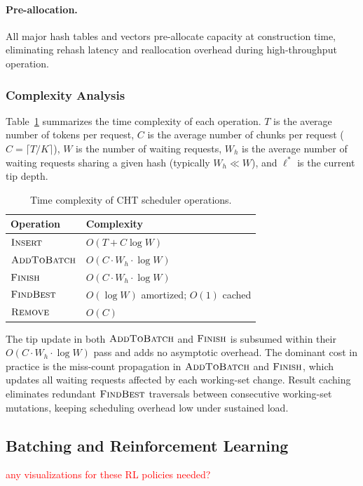 \paragraph{Pre-allocation.}
All major hash tables and vectors pre-allocate capacity at construction time, eliminating rehash latency and reallocation overhead during high-throughput operation.

\subsubsection*{Complexity Analysis}

Table~\ref{tab:complexity} summarizes the time complexity of each operation. $T$ is the average number of tokens per request, $C$ is the average number of chunks per request ($C = \lceil T/K \rceil$), $W$ is the number of waiting requests, $W_h$ is the average number of waiting requests sharing a given hash (typically $W_h \ll W$), and $\ell^*$ is the current tip depth.

\begin{table}[H]
\centering
\caption{Time complexity of CHT scheduler operations.}
\label{tab:complexity}
\begin{tabular}{ll}
\hline
\textbf{Operation} & \textbf{Complexity} \\
\hline
$\textsc{Insert}$      & $O(T + C \log W)$ \\
$\textsc{AddToBatch}$  & $O(C \cdot W_h \cdot \log W)$ \\
$\textsc{Finish}$      & $O(C \cdot W_h \cdot \log W)$ \\
$\textsc{FindBest}$    & $O(\log W)$ amortized; $O(1)$ cached \\
$\textsc{Remove}$      & $O(C)$ \\
\hline
\end{tabular}
\end{table}

The tip update in both $\textsc{AddToBatch}$ and $\textsc{Finish}$ is subsumed within their $O(C \cdot W_h \cdot \log W)$ pass and adds no asymptotic overhead. The dominant cost in practice is the miss-count propagation in $\textsc{AddToBatch}$ and $\textsc{Finish}$, which updates all waiting requests affected by each working-set change. Result caching eliminates redundant $\textsc{FindBest}$ traversals between consecutive working-set mutations, keeping scheduling overhead low under sustained load.

\subsection{Batching and Reinforcement Learning}
\label{sec:batching_rl}
\textcolor{red}{any visualizations for these RL policies needed?}

